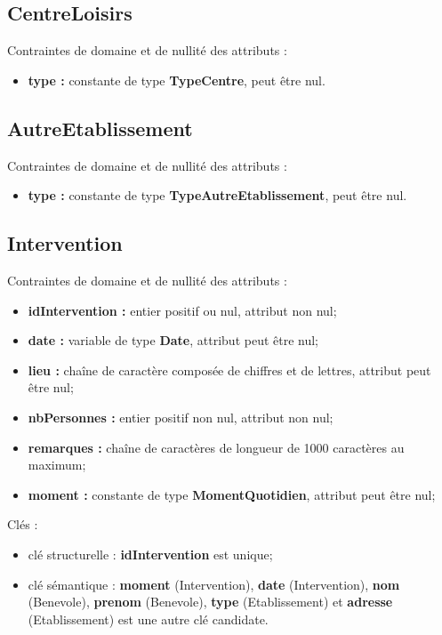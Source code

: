 \documentclass[asi, sansVersion]{picInsa}
\begin{document}
\subsection*{CentreLoisirs}
Contraintes de domaine et de nullité des attributs :
\begin{itemize}
	\item \textbf{type :} constante de type \textbf{TypeCentre}, peut être nul.\\
\end{itemize}

\subsection*{AutreEtablissement}
Contraintes de domaine et de nullité des attributs :
\begin{itemize}
	\item \textbf{type :} constante de type \textbf{TypeAutreEtablissement}, peut être nul.\\
\end{itemize}

\subsection*{Intervention} 
Contraintes de domaine et de nullité des attributs :
\begin{itemize}
 	\item \textbf{idIntervention :} entier positif ou nul, attribut non nul;
	\item \textbf{date :} variable de type \textbf{Date}, attribut peut être nul;
	\item \textbf{lieu :} chaîne de caractère composée de chiffres et de lettres, attribut peut être nul;
	\item \textbf{nbPersonnes :} entier positif non nul, attribut non nul;  
	\item \textbf{remarques :} chaîne de caractères de longueur de 1000 caractères au maximum;
	\item \textbf{moment :} constante de type \textbf{MomentQuotidien}, attribut peut être nul;\\
\end{itemize}  

Clés : 
\begin{itemize}
\item clé structurelle : \textbf{idIntervention} est unique;
\item clé sémantique : \textbf{moment} (Intervention), \textbf{date} (Intervention), \textbf{nom} (Benevole), \textbf{prenom} (Benevole), \textbf{type} (Etablissement) et \textbf{adresse} (Etablissement) est une autre clé candidate. \\ 
\end{itemize}
\end{document}
